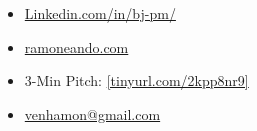 
\begin{itemize}
 \setlength\itemsep{-0.3em}
 \item \href{https://www.linkedin.com/in/bj-pm/}{Linkedin.com/in/bj-pm/}
\item \href{http://www.ramoneando.com}{ramoneando.com}
\item 3-Min Pitch:
\href{https://youtu.be/0ZllEEaVkq0?t=5203}{[tinyurl.com/2kpp8nr9]}
\item
\href{venhamon@gmail.com}{venhamon@gmail.com}
\end{itemize}
